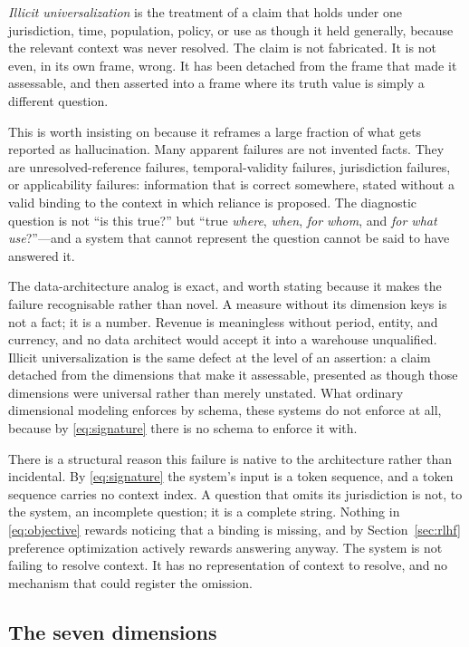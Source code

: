 \emph{Illicit universalization} is the treatment of a claim that holds under one
jurisdiction, time, population, policy, or use as though it held generally, because
the relevant context was never resolved. The claim is not fabricated. It is not
even, in its own frame, wrong. It has been detached from the frame that made it
assessable, and then asserted into a frame where its truth value is simply a
different question.

This is worth insisting on because it reframes a large fraction of what gets
reported as hallucination. Many apparent failures are not invented facts. They are
unresolved-reference failures, temporal-validity failures, jurisdiction failures,
or applicability failures: information that is correct somewhere, stated without a
valid binding to the context in which reliance is proposed. The diagnostic question
is not ``is this true?'' but ``true \emph{where}, \emph{when}, \emph{for whom}, and
\emph{for what use}?''---and a system that cannot represent the question cannot be
said to have answered it.

The data-architecture analog is exact, and worth stating because it makes the
failure recognisable rather than novel. A measure without its dimension keys is not
a fact; it is a number. Revenue is meaningless without period, entity, and currency,
and no data architect would accept it into a warehouse unqualified. Illicit
universalization is the same defect at the level of an assertion: a claim detached
from the dimensions that make it assessable, presented as though those dimensions
were universal rather than merely unstated. What ordinary dimensional modeling
enforces by schema, these systems do not enforce at all, because by
\eqref{eq:signature} there is no schema to enforce it with.

There is a structural reason this failure is native to the architecture rather than
incidental. By \eqref{eq:signature} the system's input is a token sequence, and a
token sequence carries no context index. A question that omits its jurisdiction is
not, to the system, an incomplete question; it is a complete string. Nothing in
\eqref{eq:objective} rewards noticing that a binding is missing, and by
Section~\ref{sec:rlhf} preference optimization actively rewards answering anyway.
The system is not failing to resolve context. It has no representation of context
to resolve, and no mechanism that could register the omission.

\subsection{The seven dimensions}
\label{sec:six-dimensions}

